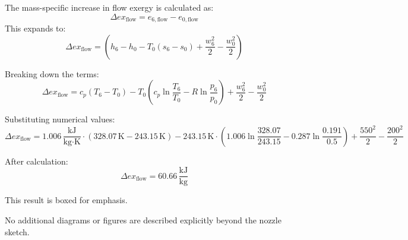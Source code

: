 The mass-specific increase in flow exergy is calculated as:  
\[
\Delta ex_{\text{flow}} = e_{6,\text{flow}} - e_{0,\text{flow}}
\]  
This expands to:  
\[
\Delta ex_{\text{flow}} = \left( h_6 - h_0 - T_0 (s_6 - s_0) + \frac{w_6^2}{2} - \frac{w_0^2}{2} \right)
\]  

Breaking down the terms:  
\[
\Delta ex_{\text{flow}} = c_p (T_6 - T_0) - T_0 \left( c_p \ln \frac{T_6}{T_0} - R \ln \frac{p_6}{p_0} \right) + \frac{w_6^2}{2} - \frac{w_0^2}{2}
\]  

Substituting numerical values:  
\[
\Delta ex_{\text{flow}} = 1.006 \, \frac{\text{kJ}}{\text{kg·K}} \cdot (328.07 \, \text{K} - 243.15 \, \text{K}) - 243.15 \, \text{K} \cdot \left( 1.006 \ln \frac{328.07}{243.15} - 0.287 \ln \frac{0.191}{0.5} \right) + \frac{550^2}{2} - \frac{200^2}{2}
\]  

After calculation:  
\[
\Delta ex_{\text{flow}} = 60.66 \, \frac{\text{kJ}}{\text{kg}}
\]  

This result is boxed for emphasis.  

No additional diagrams or figures are described explicitly beyond the nozzle sketch.